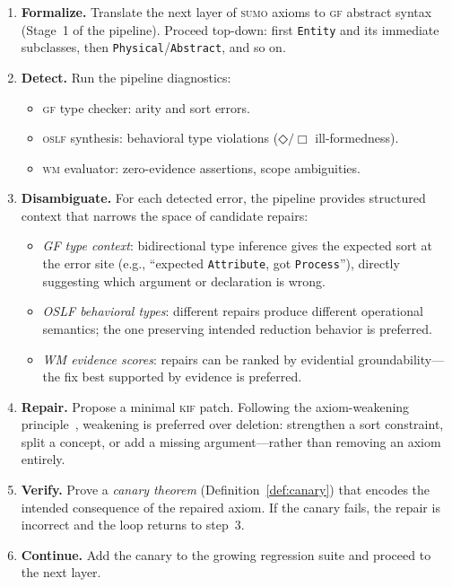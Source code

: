 \documentclass[11pt]{article}
\newcommand{\DiamondOp}{\mathbin{\Diamond}}
\newcommand{\BoxOp}{\mathbin{\Box}}
\newcommand{\KIF}{\textsc{kif}}
\newcommand{\SUMO}{\textsc{sumo}}
\newcommand{\GF}{\textsc{gf}}
\newcommand{\OSLF}{\textsc{oslf}}
\newcommand{\WM}{\textsc{wm}}
\theoremstyle{definition}
\theoremstyle{plain}
\begin{document}
\begin{enumerate}
  \item \textbf{Formalize.}  Translate the next layer of \SUMO{} axioms
    to \GF{} abstract syntax (Stage~1 of the pipeline).  Proceed
    top-down: first \texttt{Entity} and its immediate subclasses, then
    \texttt{Physical}/\texttt{Abstract}, and so on.

  \item \textbf{Detect.}  Run the pipeline diagnostics:
    \begin{itemize}[nosep]
      \item \GF{} type checker: arity and sort errors.
      \item \OSLF{} synthesis: behavioral type violations
        ($\DiamondOp/\BoxOp$ ill-formedness).
      \item \WM{} evaluator: zero-evidence assertions, scope
        ambiguities.
    \end{itemize}

  \item \textbf{Disambiguate.}  For each detected error, the pipeline
    provides structured context that narrows the space of candidate
    repairs:
    \begin{itemize}[nosep]
      \item \emph{GF type context}: bidirectional type inference gives
        the expected sort at the error site (e.g., ``expected
        \texttt{Attribute}, got \texttt{Process}''), directly suggesting
        which argument or declaration is wrong.
      \item \emph{OSLF behavioral types}: different repairs produce
        different operational semantics; the one preserving intended
        reduction behavior is preferred.
      \item \emph{WM evidence scores}: repairs can be ranked by
        evidential groundability---the fix best supported by evidence
        is preferred.
    \end{itemize}

  \item \textbf{Repair.}  Propose a minimal \KIF{} patch.
    Following the axiom-weakening
    principle~\cite{troquard2018weakening}, weakening is preferred over
    deletion: strengthen a sort constraint, split a concept, or add a
    missing argument---rather than removing an axiom entirely.

  \item \textbf{Verify.}  Prove a \emph{canary theorem}
    (Definition~\ref{def:canary}) that encodes the intended consequence
    of the repaired axiom.  If the canary fails, the repair is
    incorrect and the loop returns to step~3.

  \item \textbf{Continue.}  Add the canary to the growing regression
    suite and proceed to the next layer.
\end{enumerate}
\end{document}
